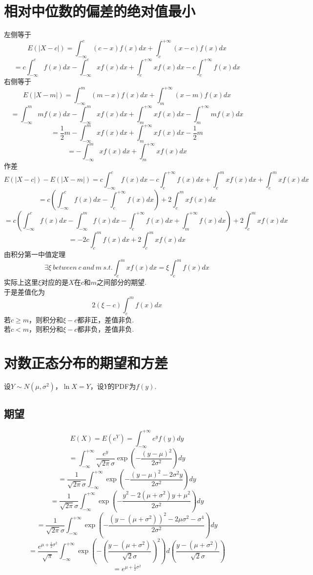 \documentclass{article}
\begin{document}
\begin{CJK}{UTF8}{gbsn}
\section{相对中位数的偏差的绝对值最小}
左侧等于
$$E(|X-c|)=\int_{-\infty}^{c}(c-x)f(x)dx+\int_{c}^{+\infty}(x-c)f(x)dx$$
$$ =c\int_{-\infty}^{c}f(x)dx-\int_{-\infty}^{c}xf(x)dx+\int_{c}^{+\infty}xf(x)dx-c\int_{c}^{+\infty}f(x)dx$$
右侧等于
$$E(|X-m|)=\int_{-\infty}^{m}(m-x)f(x)dx+\int_{m}^{+\infty}(x-m)f(x)dx$$
$$ =\int_{-\infty}^{m}mf(x)dx-\int_{-\infty}^{m}xf(x)dx+\int_{m}^{+\infty}xf(x)dx-\int_{m}^{+\infty}mf(x)dx$$
$$ =\frac{1}{2}m-\int_{-\infty}^{m}xf(x)dx+\int_{m}^{+\infty}xf(x)dx-\frac{1}{2}m$$
$$ =-\int_{-\infty}^{m}xf(x)dx+\int_{m}^{+\infty}xf(x)dx$$
作差
$$E(|X-c|)-E(|X-m|)=c\int_{-\infty}^{c}f(x)dx-c\int_{c}^{+\infty}f(x)dx+\int_{c}^{m}xf(x)dx+\int_{c}^{m}xf(x)dx$$
$$ =c(\int_{-\infty}^{c}f(x)dx-\int_{c}^{+\infty}f(x)dx)+2\int_{c}^{m}xf(x)dx$$
$$ =c(\int_{-\infty}^{c}f(x)dx-\int_{-\infty}^{m}f(x)dx-\int_{c}^{+\infty}f(x)dx+\int_{m}^{+\infty}f(x)dx)+2\int_{c}^{m}xf(x)dx$$
$$ =-2c\int_{c}^{m}f(x)dx+2\int_{c}^{m}xf(x)dx$$
由积分第一中值定理
$$\exists\xi\ between\ c\ and\ m\ s.t. \int_{c}^{m}xf(x)dx=\xi\int_{c}^{m}f(x)dx$$
实际上这里$\xi$对应的是$X$在$c$和$m$之间部分的期望.
\\于是差值化为
$$2(\xi-c)\int_{c}^{m}f(x)dx$$
若$c\geq m$，则积分和$\xi-c$都非正，差值非负.
\\若$c<m$，则积分和$\xi-c$都非负，差值非负.
\section{对数正态分布的期望和方差}
设$Y\sim N(\mu,\sigma^{2})$，$\ln X=Y$，设$Y$的PDF为$f(y)$.
\subsection{期望}
$$ E(X)=E(e^{Y})=\int_{-\infty}^{+\infty}e^{y}f(y)dy$$
$$ =\int_{-\infty}^{+\infty}\frac{e^{y}}{\sqrt{2\pi}\sigma}\exp(-\frac{(y-\mu)^{2}}{2\sigma^{2}})dy$$
$$ =\frac{1}{\sqrt{2\pi}\sigma}\int_{-\infty}^{+\infty}\exp(-\frac{(y-\mu)^{2}-2\sigma^{2}y}{2\sigma^{2}})dy$$
$$ =\frac{1}{\sqrt{2\pi}\sigma}\int_{-\infty}^{+\infty}\exp(-\frac{y^{2}-2(\mu+\sigma^{2})y+\mu^{2}}{2\sigma^{2}})dy$$
$$ =\frac{1}{\sqrt{2\pi}\sigma}\int_{-\infty}^{+\infty}\exp(-\frac{(y-(\mu+\sigma^{2}))^{2}-2\mu\sigma^{2}-\sigma^{4}}{2\sigma^{2}})dy$$
$$ =\frac{e^{\mu+\frac{1}{2}\sigma^{2}}}{\sqrt{\pi}}\int_{-\infty}^{+\infty}\exp(-(\frac{y-(\mu+\sigma^{2})}{\sqrt{2}\sigma})^{2})d(\frac{y-(\mu+\sigma^{2})}{\sqrt{2}\sigma})$$
$$ =e^{\mu+\frac{1}{2}\sigma^{2}}$$

\end{CJK}
\end{document}
